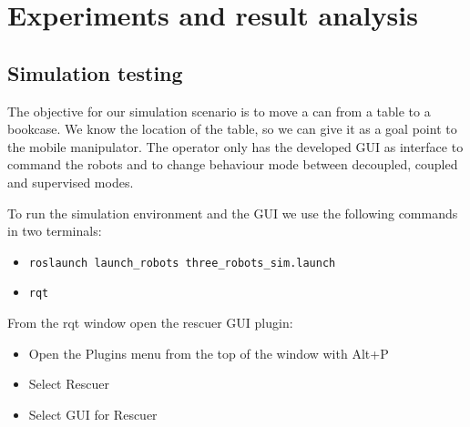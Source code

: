 \documentclass[11pt,a4paper]{article}
\begin{document}
\section{Experiments and result analysis}

\subsection{Simulation testing}
The objective for our simulation scenario is to move a can from a table to a bookcase. We know the location of the table, so we can give it as a goal point to the mobile manipulator. The operator only has the developed GUI as interface to command the robots and to change behaviour mode between decoupled, coupled and supervised modes.

To run the simulation environment and the GUI we use the following commands in two terminals:
\begin{itemize}
	\item \verb!roslaunch launch_robots three_robots_sim.launch!
	\item \verb!rqt!
\end{itemize}

From the rqt window open the rescuer GUI plugin:
\begin{itemize}
   	\item Open the Plugins menu from the top of the window with Alt+P
   	\item Select Rescuer
	\item Select GUI for Rescuer
\end{itemize}
\end{document}
